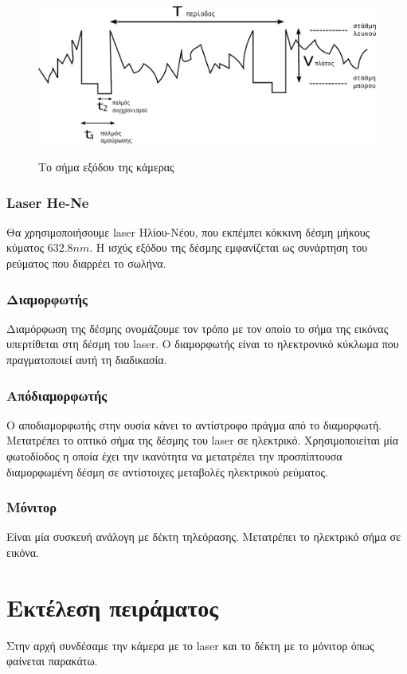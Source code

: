 \documentclass[a4paper,11pt,titlepage]{article}
\makeatletter
\def\maxwidth{
\ifdim\Gin@nat@width>\linewidth
\linewidth
\else
\Gin@nat@width
\fi
    }
\makeatother
\begin{document}
\begin{figure}[!h]
\centering
\includegraphics[width=\maxwidth]{signal.pdf}\\[0.3cm]
\caption{Το σήμα εξόδου της κάμερας}
\end{figure}

\newpage
\subsubsection{Laser He-Ne}
Θα χρησιμοποιήσουμε laser Ηλίου-Νέου, που εκπέμπει κόκκινη δέσμη μήκους κύματος $632.8nm$. Η ισχύς εξόδου της δέσμης εμφανίζεται ως συνάρτηση του ρεύματος που διαρρέει το σωλήνα.

\subsubsection{Διαμορφωτής}
Διαμόρφωση της δέσμης ονομάζουμε τον τρόπο με τον οποίο το σήμα της εικόνας υπερτίθεται στη δέσμη του laser. O διαμορφωτής είναι το ηλεκτρονικό κύκλωμα που πραγματοποιεί αυτή τη διαδικασία.

\subsubsection{Απόδιαμορφωτής}
Ο αποδιαμορφωτής στην ουσία κάνει το αντίστροφο πράγμα από το διαμορφωτή. Μετατρέπει το οπτικό σήμα της δέσμης του laser σε ηλεκτρικό. Χρησιμοποιείται μία φωτοδίοδος η οποία έχει την ικανότητα να μετατρέπει την προσπίπτουσα διαμορφωμένη δέσμη σε αντίστοιχες μεταβολές ηλεκτρικού ρεύματος.

\subsubsection{Μόνιτορ}
Είναι μία συσκευή ανάλογη με δέκτη τηλεόρασης. Μετατρέπει το ηλεκτρικό σήμα σε εικόνα.

\section{Εκτέλεση πειράματος}
Στην αρχή συνδέσαμε την κάμερα με το laser και το δέκτη με το μόνιτορ όπως φαίνεται παρακάτω. 
\end{document}
